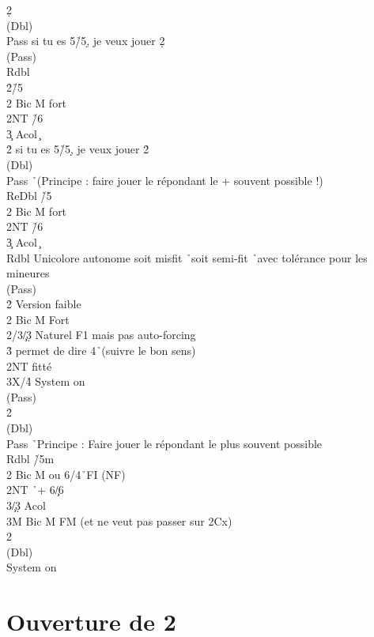 \documentclass[a4paper]{article}
\begin{document}
\begin{bidtable}
2\d\+\\
(Dbl)\+\\
Pass \> si tu es 5\h /5\d , je veux jouer 2\d \+\\
(Pass)\+\\
Rdbl \h \\
2\h {}\h /5\c \\
2\s \> Bic M fort\\
2NT \h /6\c \\
3\c \> Acol \c \-\-\\
2\h \> si tu es 5\h /5\d , je veux jouer 2\h \+\\
(Dbl)\+\\
Pass \h\ (Principe : faire jouer le répondant le + souvent possible !)\\
ReDbl \h /5\c \\
2\s \> Bic M fort\\
2NT \h /6\c \\
3\c \> Acol \c \-\-\\
Rdbl \> Unicolore autonome soit misfit \h\ soit semi-fit \h\ avec tolérance pour les mineures\+\\
(Pass)\+\\
2\h \> Version faible\\
2\s \> Bic M Fort\-\-\\
2\s/3\c/3\d \> Naturel F1 mais pas auto-forcing\\
3\h \> permet de dire 4\h\ (suivre le bon sens)\\
2NT \> fitté\\
3X/4\h \> System on\-\\
(Pass)\+\\
2\h\+\\
(Dbl)\+\\
Pass \h\ Principe : Faire jouer le répondant le plus souvent possible\\
Rdbl \h /5m\\
2\s \> Bic M ou 6\s /4\h\ FI (NF)\\
2NT \h\ + 6\c /6\d \\
3\c/3\d \> Acol\\
3M \> Bic M FM (et ne veut pas passer sur 2Cx)\-\-\\
2\s\+\\
(Dbl)\+\\
System \> on\-\-\-\-
\end{bidtable}

\section{Ouverture de 2\pdfh}
\end{document}
